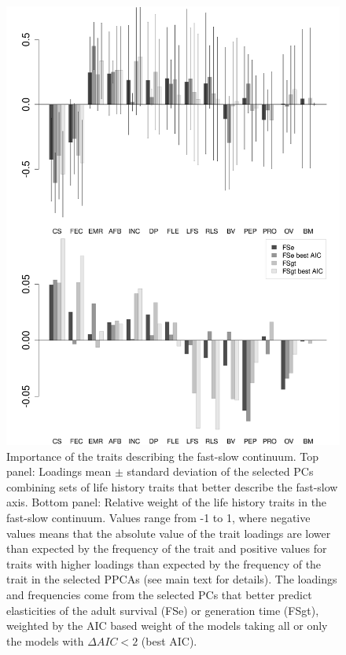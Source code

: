 \begin{figure}
\centering
\includegraphics[width=\textwidth]{./Figures/chapter02/fig2-FSaxes.png}
\caption[Fast-Slow PC loadings]{
Importance of the traits describing the fast-slow continuum. Top panel: Loadings 
mean $\pm$ standard deviation of the selected PCs combining sets of life history traits that
better describe the fast-slow axis. Bottom panel: Relative weight of the life 
history traits in the fast-slow continuum. Values range from -1 to 1, where 
negative values means that the absolute value of the trait loadings are lower 
than expected by the frequency of the trait and positive values for traits with 
higher loadings than expected by the frequency of the trait in the selected 
PPCAs (see main text for details). The loadings and frequencies come from the
selected PCs that better predict elasticities of the adult survival (FSe) or
generation time (FSgt), weighted by the AIC based weight of the models taking
all or only the models with $\Delta AIC < 2$ (best AIC).}
\label{fig:fig2.2}
\end{figure}


